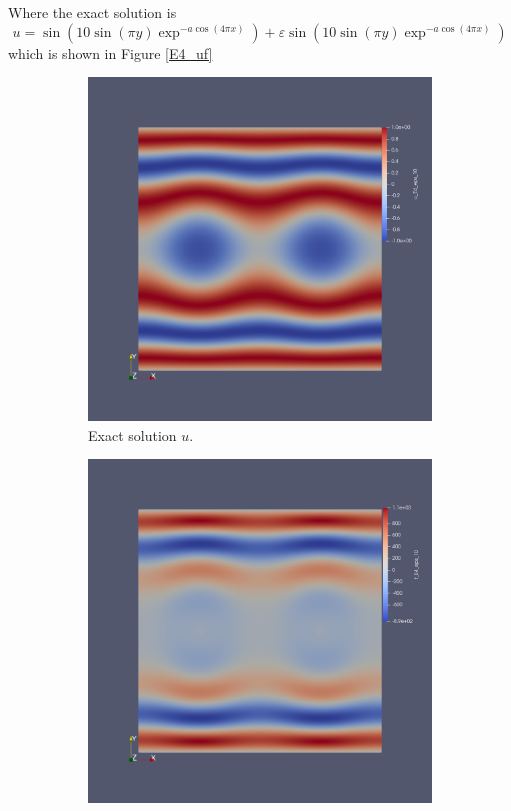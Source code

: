 \documentclass[12pt]{ociamthesis}
\begin{document}
Where the exact solution is 
\begin{equation}
u = \sin(10 \sin(\pi y) \exp^{-a\cos(4 \pi x)})  + \varepsilon \sin(10 \sin(\pi y) \exp^{-a\cos(4 \pi x)})
\end{equation}
which is shown in Figure \ref{E4_uf}

\begin{figure}[H]
 \begin{subfigure}{0.5\textwidth}
     \includegraphics[width=\textwidth]{Pics/uf/U_E4_eps_10.png}
     \caption{Exact solution $u$.}
 \end{subfigure}
   \begin{subfigure}{0.5\textwidth}
     \includegraphics[width=\textwidth]{Pics/uf/F_E4_eps_10.png}

\end{subfigure}
\end{figure}
\end{document}
